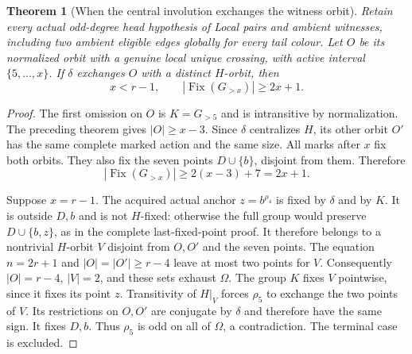 \documentclass[11pt,a4paper]{article}
\newtheorem{theorem}[lemma]{Theorem}
\begin{document}
\begin{theorem}[When the central involution exchanges the witness orbit]
Retain every actual odd-degree head hypothesis of
\emph{Local pairs and ambient witnesses}, including
two ambient eligible edges globally for every
tail colour. Let $O$ be its normalized orbit with
a genuine local unique crossing, with active
interval $\{5,\ldots,x\}$. If $\delta$ exchanges
$O$ with a distinct $H$-orbit, then
\[
                x<r-1,\qquad
                |\operatorname{Fix}(G_{>x})|\ge2x+1.
\]
\end{theorem}
\begin{proof}
The first omission on $O$ is $K=G_{>5}$ and is
intransitive by normalization. The preceding
theorem gives $|O|\ge x-3$. Since $\delta$
centralizes $H$, its other orbit $O'$ has the
same complete marked action and the same size.
All marks after $x$ fix both orbits. They also
fix the seven points $D\cup\{b\}$, disjoint
from them. Therefore
\[
            |\operatorname{Fix}(G_{>x})|
                         \ge2(x-3)+7=2x+1.
\]

Suppose $x=r-1$. The acquired actual anchor
$z=b^{\rho_4}$ is fixed by $\delta$ and by $K$.
It is outside $D,b$ and is not $H$-fixed: otherwise
the full group would preserve $D\cup\{b,z\}$,
as in the complete last-fixed-point proof.
It therefore belongs to a nontrivial $H$-orbit
$V$ disjoint from $O,O'$ and the seven points.
The equation $n=2r+1$ and $|O|=|O'|\ge r-4$
leave at most two points for $V$. Consequently
$|O|=r-4$, $|V|=2$, and these sets exhaust $\Omega$.
The group $K$ fixes $V$ pointwise, since it fixes
its point $z$. Transitivity of $H|_V$ forces
$\rho_5$ to exchange the two points of $V$.
Its restrictions on $O,O'$ are conjugate by
$\delta$ and therefore have the same sign.
It fixes $D,b$. Thus $\rho_5$ is odd on all
of $\Omega$, a contradiction. The terminal
case is excluded.
\end{proof}
\end{document}
